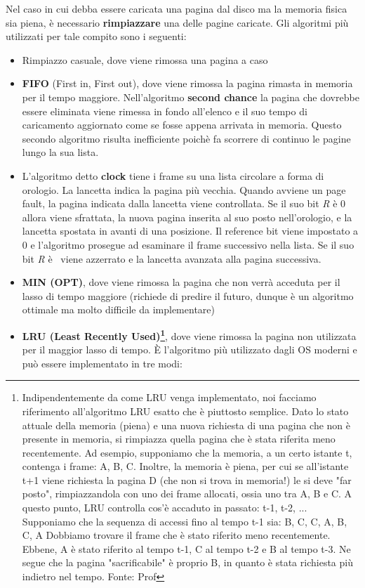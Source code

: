 \documentclass{article}
\begin{document}
Nel caso in cui debba essere caricata una pagina dal disco ma la memoria fisica sia piena, è necessario \textbf{rimpiazzare} una delle pagine caricate. Gli algoritmi più utilizzati per tale compito sono i seguenti:
\begin{itemize}
    \item Rimpiazzo casuale, dove viene rimossa una pagina a caso
    \item \textbf{FIFO} (First in, First out), dove viene rimossa la pagina rimasta in memoria per
    il tempo maggiore. Nell'algoritmo \textbf{second chance} la pagina che dovrebbe essere eliminata viene rimessa in fondo all'elenco e il suo tempo di caricamento aggiornato come se fosse appena arrivata in memoria. Questo secondo algoritmo risulta inefficiente poichè fa scorrere di continuo le pagine lungo la sua lista.
    \item L'algoritmo detto \textbf{clock} tiene i frame su una lista circolare a forma di orologio. La lancetta indica la pagina più vecchia. Quando avviene un page fault, la pagina indicata dalla lancetta viene controllata. Se il suo bit \textit{R} è 0 allora viene sfrattata, la nuova pagina inserita al suo posto nell'orologio, e la lancetta spostata in avanti di una posizione. Il reference bit viene impostato a 0 e l'algoritmo prosegue ad esaminare il frame successivo nella lista. Se il suo bit \textit{R} è \ viene azzerrato e la lancetta avanzata alla pagina successiva. 
    \item \textbf{MIN (OPT)}, dove viene rimossa la pagina che non verrà acceduta per il lasso di tempo maggiore (richiede di predire il futuro, dunque è un algoritmo ottimale ma molto difficile da implementare)
    \item \textbf{LRU (Least Recently Used)\footnote{Indipendentemente da come LRU venga implementato, noi facciamo riferimento all'algoritmo LRU esatto che è piuttosto semplice. Dato lo stato attuale della memoria (piena) e una nuova richiesta di una pagina che non è presente in memoria, si rimpiazza quella pagina che è stata riferita meno recentemente. 
    Ad esempio, supponiamo che la memoria, a un certo istante t, contenga i frame: A, B, C. Inoltre, la memoria è piena, per cui se all'istante t+1 viene richiesta la pagina D (che non si trova in memoria!) le si deve "far posto", rimpiazzandola con uno dei frame allocati, ossia uno tra A, B e C.
    A questo punto, LRU controlla cos'è accaduto in passato: t-1, t-2, ...
    Supponiamo che la sequenza di accessi fino al tempo t-1 sia: B, C, C, A, B, C, A
    Dobbiamo trovare il frame che è stato riferito meno recentemente. Ebbene, A è stato riferito al tempo t-1, C al tempo t-2 e B al tempo t-3. Ne segue che la pagina "sacrificabile" è proprio B, in quanto è stata richiesta più indietro nel tempo. Fonte: Prof}}, dove viene rimossa la pagina non utilizzata per il maggior lasso di tempo. È l'algoritmo più utilizzato dagli OS moderni e può essere implementato in tre modi:

\end{itemize}
\end{document}

